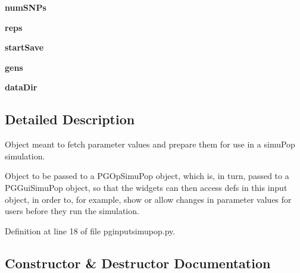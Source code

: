 \begin{DoxyCompactItemize}
\item 
{\bfseries num\+S\+N\+Ps}\hypertarget{classnegui_1_1pginputsimupop_1_1PGInputSimuPop_a1125f77d55338c88bf0d4bce14d90f5b}{}\label{classnegui_1_1pginputsimupop_1_1PGInputSimuPop_a1125f77d55338c88bf0d4bce14d90f5b}

\item 
{\bfseries reps}\hypertarget{classnegui_1_1pginputsimupop_1_1PGInputSimuPop_ad9123c2163f7ab6a1e0903bd63316ca6}{}\label{classnegui_1_1pginputsimupop_1_1PGInputSimuPop_ad9123c2163f7ab6a1e0903bd63316ca6}

\item 
{\bfseries start\+Save}\hypertarget{classnegui_1_1pginputsimupop_1_1PGInputSimuPop_a73ab30f9db93cfbd18580023886774d8}{}\label{classnegui_1_1pginputsimupop_1_1PGInputSimuPop_a73ab30f9db93cfbd18580023886774d8}

\item 
{\bfseries gens}\hypertarget{classnegui_1_1pginputsimupop_1_1PGInputSimuPop_aceb30da861b01f9f89e7b2d1fe78ba32}{}\label{classnegui_1_1pginputsimupop_1_1PGInputSimuPop_aceb30da861b01f9f89e7b2d1fe78ba32}

\item 
{\bfseries data\+Dir}\hypertarget{classnegui_1_1pginputsimupop_1_1PGInputSimuPop_a423a2c1ac08af8ba57663207700e5796}{}\label{classnegui_1_1pginputsimupop_1_1PGInputSimuPop_a423a2c1ac08af8ba57663207700e5796}

\end{DoxyCompactItemize}


\subsection{Detailed Description}
\begin{DoxyVerb}Object meant to fetch parameter values and prepare them for 
use in a simuPop simulation.  

Object to be passed to a PGOpSimuPop object, which is, in turn,
passed to a PGGuiSimuPop object, so that the widgets can then access
defs in this input object, in order to, for example, show or allow
changes in parameter values for users before they run the simulation.
\end{DoxyVerb}
 

Definition at line 18 of file pginputsimupop.\+py.



\subsection{Constructor \& Destructor Documentation}
